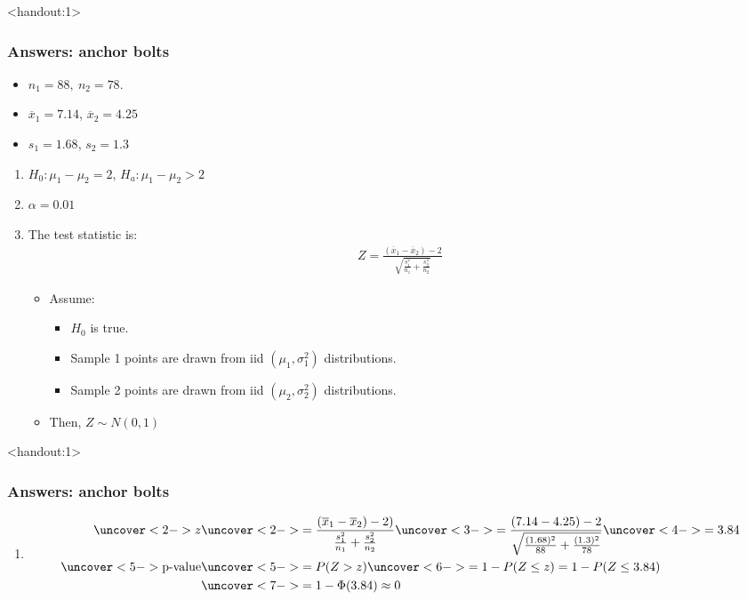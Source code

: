 \documentclass[handout]{beamer}\usepackage[]{graphicx}\usepackage[]{color}
\newcommand{\answers}{1}
\providecommand{\ov}[1]{\overline{#1}}
\numberwithin{equation}{section}
\begin{document}
\begin{frame}<handout:\answers>
\frametitle{Answers: anchor bolts}
\begin{itemize}
\item $n_1 = 88, \ n_2 = 78$.
\pause \item $\ov{x}_1 = 7.14$, $\ov{x}_2 = 4.25$ 
\pause \item $s_1 = 1.68$, $s_2 = 1.3$
\end{itemize}
\begin{enumerate}[1. ]
\pause \item $H_0: \mu_1 - \mu_2 = 2$, $H_a: \mu_1 - \mu_2 > 2$
\pause \item $\alpha = 0.01$
\pause \item The test statistic is:
\pause \begin{align*}
Z = \frac{(\ov{x}_1 - \ov{x}_2) - 2}{\sqrt{\frac{s^2_1}{n_1} + \frac{s^2_2}{n_2}}}
\end{align*}
\begin{itemize}
\pause \item Assume:
\begin{itemize}
\pause \item $H_0$ is true.
\pause \item Sample 1 points are drawn from iid $(\mu_1, \sigma^2_1)$ distributions.
\pause \item Sample 2 points are drawn from iid $(\mu_2, \sigma^2_2)$ distributions.
\end{itemize}
\pause \item Then, $Z \sim N(0,1)$
\end{itemize}
\end{enumerate}
\end{frame}

\begin{frame}<handout:\answers>
\frametitle{Answers: anchor bolts}
\begin{enumerate}[1. ]
 \setcounter{enumi}{\value{saveenum}}
\item 
\begin{align*}
\uncover<2->{z} &\uncover<2->{=  \frac{(\ov{x}_1 - \ov{x}_2) - 2)}{\frac{s^2_1}{n_1} + \frac{s^2_2}{n_2}}} \uncover<3->{ = \frac{(7.14 - 4.25) - 2}{\sqrt{\frac{(1.68)^2}{88} + \frac{(1.3)^2}{78} }}}\uncover<4->{ = 3.84} \\
\uncover<5->{\text{p-value}} &\uncover<5->{= P(Z > z) } \uncover<6->{= 1 - P(Z \le z ) = 1 - P(Z \le 3.84)}  \\
&\uncover<7->{= 1 - \Phi(3.84) \approx 0}
\end{align*}
\end{enumerate}
\end{frame}
\end{document}
